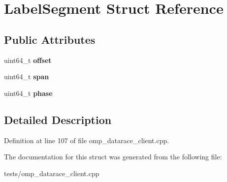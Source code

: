 \hypertarget{structLabelSegment}{\section{Label\-Segment Struct Reference}
\label{structLabelSegment}
}
\subsection*{Public Attributes}
\begin{DoxyCompactItemize}
\item 
\hypertarget{structLabelSegment_a5db570b9e8c1159f751355b1c283df4c}{uint64\-\_\-t {\bfseries offset}}\label{structLabelSegment_a5db570b9e8c1159f751355b1c283df4c}

\item 
\hypertarget{structLabelSegment_a66ba8b81a74ef09c287d9b5860dfbbd2}{uint64\-\_\-t {\bfseries span}}\label{structLabelSegment_a66ba8b81a74ef09c287d9b5860dfbbd2}

\item 
\hypertarget{structLabelSegment_afce52f4ef97152aea35d04b693548cb6}{uint64\-\_\-t {\bfseries phase}}\label{structLabelSegment_afce52f4ef97152aea35d04b693548cb6}

\end{DoxyCompactItemize}


\subsection{Detailed Description}


Definition at line 107 of file omp\-\_\-datarace\-\_\-client.\-cpp.



The documentation for this struct was generated from the following file\-:\begin{DoxyCompactItemize}
\item 
tests/omp\-\_\-datarace\-\_\-client.\-cpp\end{DoxyCompactItemize}
